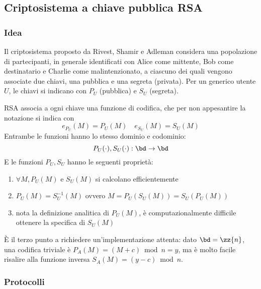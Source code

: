 \subsection{Criptosistema a chiave pubblica RSA}

\subsubsection{Idea}

Il criptosistema proposto da Rivest, Shamir e Adleman considera una popolazione di partecipanti, in generale identificati con
Alice come mittente, Bob come destinatario e Charlie come malintenzionato, a ciascuno dei quali vengono associate due chiavi, una pubblica e una segreta (privata).
Per un generico utente $U$, le chiavi si indicano con
$
P_U
$ (pubblica) e $
S_U
$
(segreta).

RSA associa a ogni chiave una funzione di codifica, che per non appesantire la notazione si indica con
\begin{equation*}
    e_{P_U} (M) = P_U (M)
    \quad
    e_{S_U} (M) = S_U (M)
\end{equation*}
Entrambe le funzioni hanno lo stesso dominio e codominio:
\begin{equation*}
    P_U(\cdot),
    S_U(\cdot) 
    : \bd \to \bd
\end{equation*}
E le funzioni $ P_U, S_U $ hanno le seguenti proprietà:
\begin{enumerate}
    \item 
        $ \forall M,
        P_U(M)
        $ e $
        S_U(M)
        $ si calcolano efficientemente
    \item 
        $
        P_U(M)
        =
        S_U^{-1}(M)
        $
        ovvero
        $
        M = 
        P_U \left( S_U \left( M \right) \right)
        =
        S_U \left( P_U \left( M \right) \right)
        $
    \item
        nota la definizione analitica di $
        P_U(M)
        $, è computazionalmente difficile ottenere la specifica di $
        S_U(M)
        $
\end{enumerate}
È il terzo punto a richiedere un'implementazione attenta:
dato $\bd = \zz{n} $, una codifica triviale è $
P_A(M) = (M+c) \bmod n = y
$, ma è molto facile risalire alla funzione inversa $
S_A(M) = (y-c) \bmod n
$.

\subsubsection{Protocolli}

